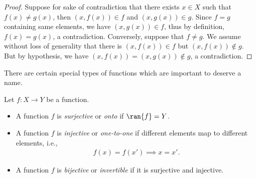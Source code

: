 \begin{proof}
    Suppose for sake of contradiction that there exists $x \in X$ such that $f(x) \neq g(x)$, then $(x, f(x)) \in f$ and $(x, g(x)) \in g$. Since $f = g$ containing same elements, we have $(x, g(x)) \in f$, thus by definition, $f(x) = g(x)$, a contradiction. Conversely, suppose that $f \neq g$. We assume without loss of generality that there is $(x, f(x)) \in f$ but $(x, f(x)) \notin g$. But by hypothesis, we have $(x, f(x)) = (x, g(x)) \notin g$, a contradiction.
\end{proof}



There are certain special types of functions which are important to deserve a name.

\begin{definition}
    Let $f : X \to Y$ be a function.
    \begin{itemize}
        \item A function $f$ is \emph{surjective} or \emph{onto} if $\ran{f} = Y$.
        \item A function $f$ is \emph{injective} or \emph{one-to-one} if different elements map to different elements, i.e.,
            \begin{align*}
                f(x) = f(x') \implies x = x'.
            \end{align*}
        \item A function $f$ is \emph{bijective} or \emph{invertible} if it is surjective and injective.
    \end{itemize}
\end{definition}






















